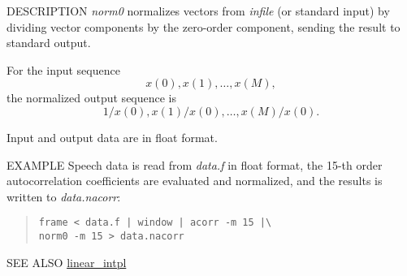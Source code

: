 \begin{synopsis}
\item[norm0] [ --m $M$ ] [ {\em infile} ]
\end{synopsis}

\begin{qsection}{DESCRIPTION}
{\em norm0} normalizes vectors from {\em infile} (or standard input) 
by dividing vector components by the zero-order component, 
sending the result to standard output.

For the input sequence
\begin{displaymath}
x(0), x(1), \dots, x(M), 
\end{displaymath}
the normalized output sequence is
\begin{displaymath}
1/x(0), x(1)/x(0), \dots, x(M)/x(0). 
\end{displaymath}

Input and output data are in float format.
\end{qsection}

\begin{options}
\end{options}

\begin{qsection}{EXAMPLE}
Speech data is read from {\em data.f} in float format,
the 15-th order autocorrelation coefficients are evaluated
and normalized, and the results is written to {\em data.nacorr}:
\begin{quote}
  \verb!frame < data.f | window | acorr -m 15 |\ !\\
  \verb!norm0 -m 15 > data.nacorr!
\end{quote}
\end{qsection}

\begin{qsection}{SEE ALSO}
\hyperlink{linear_intpl}{linear\_intpl}
\end{qsection}
